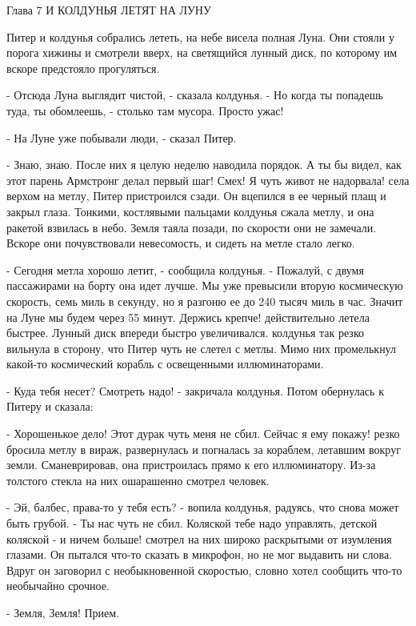 Глава 7
 И КОЛДУНЬЯ ЛЕТЯТ НА ЛУНУ
\par{} Питер и колдунья собрались лететь, на небе висела полная 
Луна. Они стояли у порога хижины и смотрели вверх, на светящийся 
лунный диск, по которому им вскоре предстояло прогуляться.
\par- Отсюда Луна выглядит чистой, - сказала колдунья. - Но когда ты 
попадешь туда, ты обомлеешь, - столько там мусора. Просто ужас!
\par- На Луне уже побывали люди, - сказал Питер.
\par- Знаю, знаю. После них я целую неделю наводила порядок. А ты бы 
видел, как этот парень Армстронг делал первый шаг! Смех! Я чуть живот 
не надорвала!
 села верхом на метлу, Питер пристроился сзади. Он 
вцепился в ее черный плащ и закрыл глаза. Тонкими, костлявыми пальцами 
колдунья сжала метлу, и она ракетой взвилась в небо. Земля таяла 
позади, по скорости они не замечали. Вскоре они почувствовали 
невесомость, и сидеть на метле стало легко.
\par- Сегодня метла хорошо летит, - сообщила колдунья. - Пожалуй, с 
двумя пассажирами на борту она идет лучше. Мы уже превысили вторую 
космическую скорость, семь миль в секунду, но я разгоню ее до 240 
тысяч миль в час. Значит на Луне мы будем через 55 минут. Держись 
крепче!
 действительно летела быстрее. Лунный диск впереди быстро 
увеличивался.
 колдунья так резко вильнула в сторону, что Питер чуть не 
слетел с метлы. Мимо них промелькнул какой-то космический корабль с 
освещенными иллюминаторами.
\par- Куда тебя несет? Смотреть надо! - закричала колдунья. Потом 
обернулась к Питеру и сказала:
\par- Хорошенькое дело! Этот дурак чуть меня не сбил. Сейчас я ему 
покажу!
 резко бросила метлу в вираж, развернулась и погналась за 
кораблем, летавшим вокруг земли. Сманеврировав, она пристроилась прямо 
к его иллюминатору. Из-за толстого стекла на них ошарашенно смотрел 
человек.
\par- Эй, балбес, права-то у тебя есть? - вопила колдунья, радуясь, 
что снова может быть грубой. - Ты нас чуть не сбил. Коляской тебе надо 
управлять, детской коляской - и ничем больше!
 смотрел на них широко раскрытыми от изумления глазами. 
Он пытался что-то сказать в микрофон, но не мог выдавить ни слова. 
Вдруг он заговорил с необыкновенной скоростью, словно хотел сообщить 
что-то необычайно срочное.
\par- Земля, Земля! Прием.
